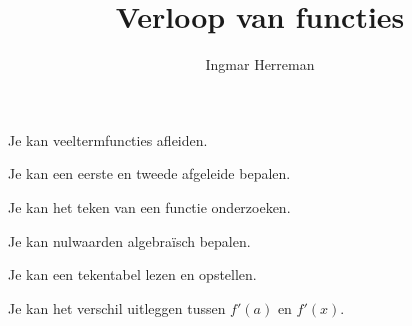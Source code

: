 \documentclass{ximera}
\title{Verloop van functies}
\author{Ingmar Herreman}
\begin{document}



























































































\maketitle



\begin{voorkennis}
    \item Je kan veeltermfuncties afleiden.
    \item Je kan een eerste en tweede afgeleide bepalen.
    \item Je kan het teken van een functie onderzoeken.
    \item Je kan nulwaarden algebraïsch bepalen.
    \item Je kan een tekentabel lezen en opstellen.
    \item Je kan het verschil uitleggen tussen $f'(a)$ en $f'(x)$.
  \end{voorkennis}
  
\end{document}
